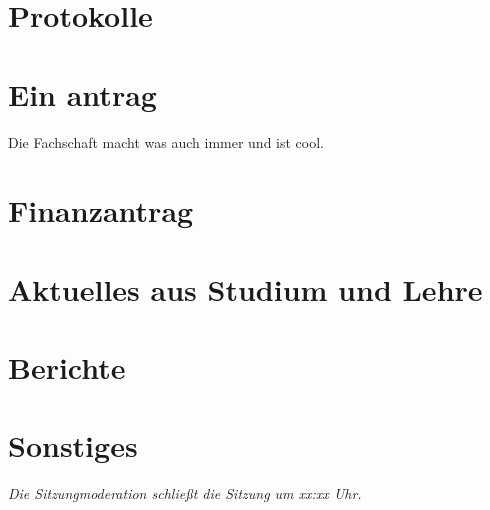 \documentclass[11pt,twosided=true]{mathphys-protocol}
\renewcommand{\sende}{xx:xx Uhr}
\begin{document}
\maketitlepage



\section{Protokolle}



\section{Ein antrag}
\begin{antrag}
Die Fachschaft macht was auch immer und ist cool.
\end{antrag}

\section{Finanzantrag}

\section{Aktuelles aus Studium und Lehre}

\section{Berichte}


\section{Sonstiges}

\emph{Die Sitzungmoderation schließt die Sitzung um \sende.}
\end{document}
